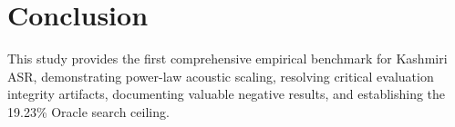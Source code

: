 \documentclass[11pt,a4paper]{article}
\begin{document}
\section{Conclusion}
This study provides the first comprehensive empirical benchmark for Kashmiri ASR, demonstrating power-law acoustic scaling, resolving critical evaluation integrity artifacts, documenting valuable negative results, and establishing the 19.23\% Oracle search ceiling.



\end{document}
